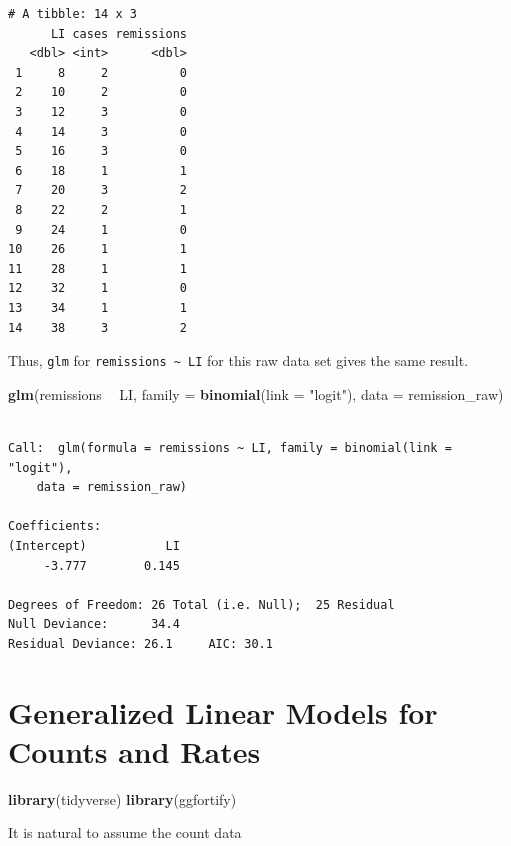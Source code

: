 \documentclass[]{book}
\newenvironment{Shaded}{\begin{snugshade}}{\end{snugshade}}
\newcommand{\DataTypeTok}[1]{\textcolor[rgb]{0.13,0.29,0.53}{#1}}
\newcommand{\KeywordTok}[1]{\textcolor[rgb]{0.13,0.29,0.53}{\textbf{#1}}}
\newcommand{\NormalTok}[1]{#1}
\newcommand{\OperatorTok}[1]{\textcolor[rgb]{0.81,0.36,0.00}{\textbf{#1}}}
\newcommand{\StringTok}[1]{\textcolor[rgb]{0.31,0.60,0.02}{#1}}
\begin{document}
\begin{verbatim}
# A tibble: 14 x 3
      LI cases remissions
   <dbl> <int>      <dbl>
 1     8     2          0
 2    10     2          0
 3    12     3          0
 4    14     3          0
 5    16     3          0
 6    18     1          1
 7    20     3          2
 8    22     2          1
 9    24     1          0
10    26     1          1
11    28     1          1
12    32     1          0
13    34     1          1
14    38     3          2
\end{verbatim}

Thus, \texttt{glm} for \texttt{remissions\ \textasciitilde{}\ LI} for this raw data set gives the same result.

\begin{Shaded}
\begin{Highlighting}[]
\KeywordTok{glm}\NormalTok{(remissions }\OperatorTok{~}\StringTok{ }\NormalTok{LI, }\DataTypeTok{family =} \KeywordTok{binomial}\NormalTok{(}\DataTypeTok{link =} \StringTok{"logit"}\NormalTok{), }\DataTypeTok{data =}\NormalTok{ remission_raw)}
\end{Highlighting}
\end{Shaded}

\begin{verbatim}

Call:  glm(formula = remissions ~ LI, family = binomial(link = "logit"), 
    data = remission_raw)

Coefficients:
(Intercept)           LI  
     -3.777        0.145  

Degrees of Freedom: 26 Total (i.e. Null);  25 Residual
Null Deviance:      34.4 
Residual Deviance: 26.1     AIC: 30.1
\end{verbatim}

\hypertarget{generalized-linear-models-for-counts-and-rates}{%
\chapter{Generalized Linear Models for Counts and Rates}\label{generalized-linear-models-for-counts-and-rates}}

\begin{Shaded}
\begin{Highlighting}[]
\KeywordTok{library}\NormalTok{(tidyverse)}
\KeywordTok{library}\NormalTok{(ggfortify)}
\end{Highlighting}
\end{Shaded}

It is natural to assume the count data
\end{document}
